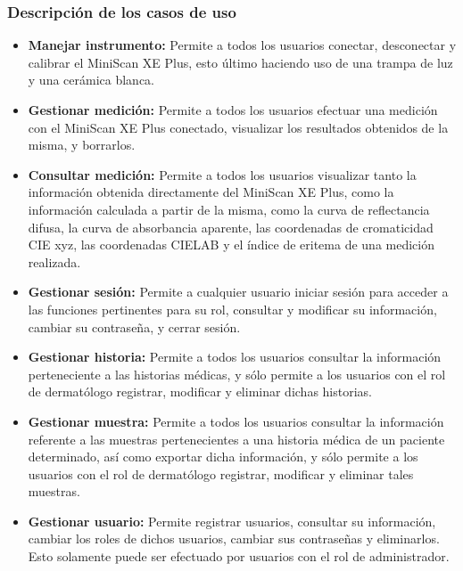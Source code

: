 	\subsubsection{Descripci\'{o}n de los casos de uso}
	
		\begin{itemize}
			\item \textbf{Manejar instrumento:} Permite a todos los usuarios conectar, desconectar y calibrar el MiniScan XE Plus, esto \'{u}ltimo haciendo uso de una trampa de luz y una cer\'{a}mica blanca.
			
			\item \textbf{Gestionar medici\'{o}n:} Permite a todos los usuarios efectuar una medici\'{o}n con el MiniScan XE Plus conectado, visualizar los resultados obtenidos de la misma, y borrarlos.
			
			\item \textbf{Consultar medici\'{o}n:} Permite a todos los usuarios visualizar tanto la informaci\'{o}n obtenida directamente del MiniScan XE Plus, como la informaci\'{o}n calculada a partir de la misma, como la curva de reflectancia difusa, la curva de absorbancia aparente, las coordenadas de cromaticidad CIE xyz, las coordenadas CIELAB y el \'{i}ndice de eritema de una medici\'{o}n realizada.
			
			\item \textbf{Gestionar sesi\'{o}n:} Permite a cualquier usuario iniciar sesi\'{o}n para acceder a las funciones pertinentes para su rol, consultar y modificar su informaci\'{o}n, cambiar su contrase\~{n}a, y cerrar sesi\'{o}n.
			
			\item \textbf{Gestionar historia:} Permite a todos los usuarios consultar la informaci\'{o}n perteneciente a las historias m\'{e}dicas, y s\'{o}lo permite a los usuarios con el rol de dermat\'{o}logo registrar, modificar y eliminar dichas historias. 
			
			\item \textbf{Gestionar muestra:} Permite a todos los usuarios consultar la informaci\'{o}n referente a las muestras pertenecientes a una historia m\'{e}dica de un paciente determinado, as\'{i} como exportar dicha informaci\'{o}n, y s\'{o}lo permite a los usuarios con el rol de dermat\'{o}logo registrar, modificar y eliminar tales muestras.
			
			\item \textbf{Gestionar usuario:} Permite registrar usuarios, consultar su informaci\'{o}n, cambiar los roles de dichos usuarios, cambiar sus contrase\~{n}as y eliminarlos. Esto solamente puede ser efectuado por usuarios con el rol de administrador.
		\end{itemize}

